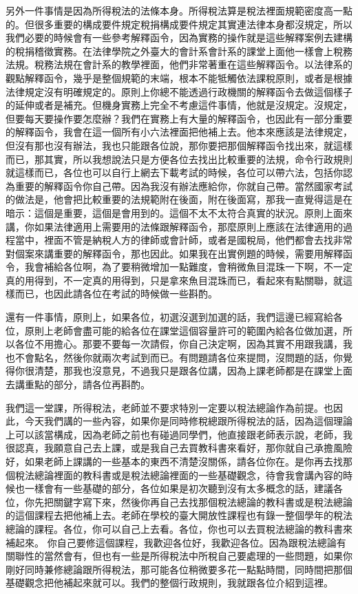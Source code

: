 \documentclass[]{ctexbook}
\begin{document}
另外一件事情是因為所得稅法的法條本身。所得稅法算是稅法裡面規範密度高一點的。但很多重要的構成要件規定稅捐構成要件規定其實連法律本身都沒規定，所以我們必要的時候會有一些參考解釋函令，因為實務的操作就是這些解釋案例去建構的稅捐稽徵實務。在法律學院之外臺大的會計系會計系的課堂上面他一樣會上稅務法規。稅務法規在會計系的教學裡面，他們非常著重在這些解釋函令。以法律系的觀點解釋函令，幾乎是整個規範的末端，根本不能牴觸依法課稅原則，或者是根據法律規定沒有明確規定的。原則上你總不能透過行政機關的解釋函令去做這個樣子的延伸或者是補充。但機身實務上完全不考慮這件事情，他就是沒規定。沒規定，但要每天要操作要怎麼辦？我們在實務上有大量的解釋函令，也因此有一部分重要的解釋函令，我會在這一個所有小六法裡面把他補上去。他本來應該是法律規定，但沒有那也沒有辦法，我也只能跟各位說，那你要把那個解釋函令找出來，就這樣而已，那其實，所以我想說法只是方便各位去找出比較重要的法規，命令行政規則就這樣而已，各位也可以自行上網去下載考試的時候，各位可以帶六法，包括你認為重要的解釋函令你自己帶。因為我沒有辦法應給你，你就自己帶。當然國家考試的做法是，他會把比較重要的法規範附在後面，附在後面寫，那我一直覺得這是在暗示：這個是重要，這個是會用到的。這個不太不太符合真實的狀況。原則上面來講，你如果法律適用上需要用的法條跟解釋函令，那麼原則上應該在法律適用的過程當中，裡面不管是納稅人方的律師或會計師，或者是國稅局，他們都會去找非常對個案來講重要的解釋函令，那也因此。如果我在出實例題的時候，需要用解釋函令，我會補給各位啊，為了要稍微增加一點難度，會稍微魚目混珠一下啊，不一定真的用得到，不一定真的用得到，只是拿來魚目混珠而已，看起來有點關聯，就這樣而已，也因此請各位在考試的時候做一些斟酌。

還有一件事情，原則上，如果各位，初選沒選到加選的話，我們這邊已經寫給各位，原則上老師會盡可能的給各位在課堂這個容量許可的範圍內給各位做加選，所以各位不用擔心。那要不要每一次請假，你自己決定啊，因為其實不用跟我講，我也不會點名，然後你就兩次考試到而已。有問題請各位來提問，沒問題的話，你覺得你很清楚，那我也沒意見，不過我只是跟各位講，因為上課老師都是在課堂上面去講重點的部分，請各位再斟酌。

我們這一堂課，所得稅法，老師並不要求特別一定要以稅法總論作為前提。也因此，今天我們講的一些內容，如果你是同時修稅總跟所得稅法的話，因為這個理論上可以該當構成，因為老師之前也有碰過同學們，他直接跟老師表示說，老師，我很認真，我願意自己去上課，或是我自己去買教科書來看好，那你就自己承擔風險好，如果老師上課講的一些基本的東西不清楚沒關係，請各位你在。是你再去找那個稅法總論裡面的教科書或是稅法總論裡面的一些基礎觀念，待會我會講內容的時候也一樣會有一些基礎的部分，各位如果是初次聽到沒有太多概念的話，建議各位，你先把關鍵字寫下來，然後你再自己去找那個稅法總論的教科書或是稅法總論的這個課程去把他補上去。老師在學校的臺大開放性課程也有錄一整個學年的稅法總論的課程。各位，你可以自己上去看。各位，你也可以去買稅法總論的教科書來補起來。
你自己要修這個課程，我歡迎各位好，我歡迎各位。因為跟稅法總論有關聯性的當然會有，但也有一些是所得稅法中所稅自己要處理的一些問題，如果你剛好同時兼修總論跟所得稅法，那可能各位稍微要多花一點點時間，同時間把那個基礎觀念把他補起來就可以。我們的整個行政規則，我就跟各位介紹到這裡。
\end{document}
